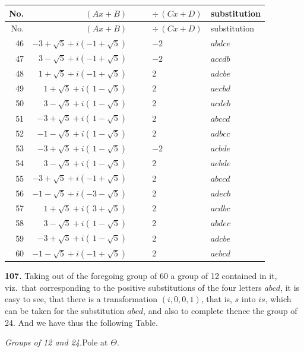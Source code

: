 \documentclass[11pt,a4paper]{article}
\newcommand{\artno}[1]{\textbf{#1.}\quad}
\begin{document}
\begin{center}
\footnotesize
\begin{longtable}{r|r|l|l|l|l}
No. & $(A x + B)$ & & & $\div\,(C x + D)$ & substitution\\\hline
\endfirsthead
No. & $(A x + B)$ & & & $\div\,(C x + D)$ & substitution\\\hline
\endhead
46 & $-3 + \sqrt5 + i(-1 + \sqrt5)$ & & & $-2$ & $abdce$\\
47 & $\;3 - \sqrt5 + i(-1 + \sqrt5)$ & & & $-2$ & $accdb$\\
48 & $\;1 + \sqrt5 + i(-1 + \sqrt5)$ & & & 2 & $adcbe$\\
49 & $\;1 + \sqrt5 + i(\,1 - \sqrt5)$ & & & 2 & $aecbd$\\
50 & $\;3 - \sqrt5 + i(\,1 - \sqrt5)$ & & & 2 & $acdeb$\\
51 & $-3 + \sqrt5 + i(\,1 - \sqrt5)$ & & & 2 & $abccd$\\
52 & $-1 - \sqrt5 + i(\,1 - \sqrt5)$ & & & 2 & $adbcc$\\
53 & $-3 + \sqrt5 + i(\,1 - \sqrt5)$ & & & $-2$ & $acbde$\\
54 & $\;3 - \sqrt5 + i(\,1 - \sqrt5)$ & & & 2 & $aebde$\\
55 & $-3 + \sqrt5 + i(-1 + \sqrt5)$ & & & 2 & $abccd$\\
56 & $-1 - \sqrt5 + i(-3 - \sqrt5)$ & & & 2 & $adecb$\\
57 & $\;1 + \sqrt5 + i(\,3 + \sqrt5)$ & & & 2 & $acdbc$\\
58 & $\;3 - \sqrt5 + i(\,1 - \sqrt5)$ & & & 2 & $abdec$\\
59 & $-3 + \sqrt5 + i(\,1 - \sqrt5)$ & & & 2 & $adcbe$\\
60 & $-1 - \sqrt5 + i(-1 + \sqrt5)$ & & & 2 & $aebcd$\\
\end{longtable}
\normalsize
\end{center}

\artno{107} Taking out of the foregoing group of 60 a group of 12 contained
in it, viz.\ that corresponding to the positive substitutions of the four
letters $abcd$, it is easy to see, that there is a transformation
$(i, 0, 0, 1)$, that is, $s$ into $is$, which can be taken for the
substitution $abcd$, and also to complete thence the group of 24. And we
have thus the following Table.

\begin{center}
\textit{Groups of 12 and 24.}\quad Pole at $\Theta$.
\end{center}
\end{document}

